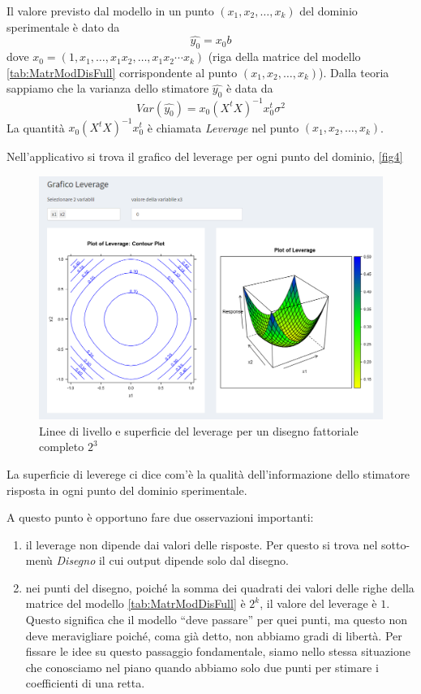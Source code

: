 \documentclass[
]{book}
\begin{document}
Il valore previsto dal modello in un punto \((x_1,x_2,\dots,x_k)\) del dominio sperimentale è dato da
\[
\hat{y_0}=x_0b
\]
dove \(x_0=(1,x_1,\dots,x_1x_2,\dots,x_1x_2\cdots x_k)\) (riga della matrice del modello \autoref{tab:MatrModDisFull} corrispondente al punto \((x_1,x_2,\dots,x_k)\)). Dalla teoria sappiamo che la varianza dello stimatore \(\hat{y_0}\) è data da
\[
Var(\hat{y_0})=x_0(X^tX)^{-1}x_0^t\sigma^2
\]
La quantità \(x_0(X^tX)^{-1}x_0^t\) è chiamata \emph{Leverage} nel punto \((x_1,x_2,\dots,x_k)\).

Nell'applicativo si trova il grafico del leverage per ogni punto del dominio, \autoref{fig4}

\begin{figure}

{\centering \includegraphics[width=1\linewidth]{Immagini/04_lev} 

}

\caption{Linee di livello e superficie del leverage per un disegno fattoriale completo $2^3$\label{fig4}}\label{fig:unnamed-chunk-6}
\end{figure}

La superficie di leverege ci dice com'è la qualità dell'informazione dello stimatore risposta in ogni punto del dominio sperimentale.

A questo punto è opportuno fare due osservazioni importanti:

\begin{enumerate}
\def\labelenumi{\arabic{enumi})}
\item
  il leverage non dipende dai valori delle risposte. Per questo si trova nel sotto-menù \emph{Disegno} il cui output dipende solo dal disegno.
\item
  nei punti del disegno, poiché la somma dei quadrati dei valori delle righe della matrice del modello \autoref{tab:MatrModDisFull} è \(2^k\), il valore del leverage è \(1\).\\
  Questo significa che il modello ``deve passare'' per quei punti, ma questo non deve meravigliare poiché, coma già detto, non abbiamo gradi di libertà. Per fissare le idee su questo passaggio fondamentale, siamo nello stessa situazione che conosciamo nel piano quando abbiamo solo due punti per stimare i coefficienti di una retta.
\end{enumerate}
\end{document}
